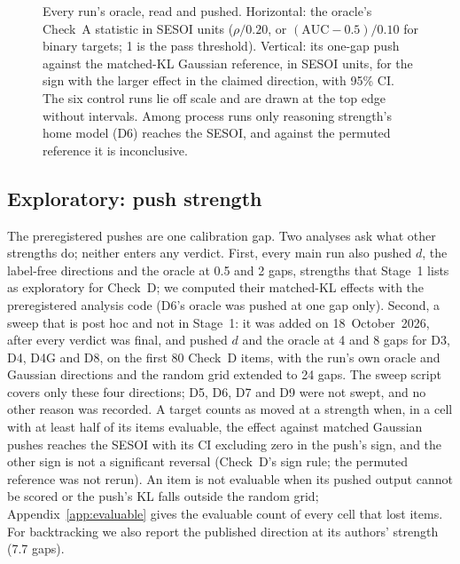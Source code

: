 \documentclass[11pt]{article}
\begin{document}
\begin{figure}[t]
\caption{Every run's oracle, read and pushed. Horizontal: the oracle's Check~A statistic in SESOI units ($\rho/0.20$, or $(\text{AUC}-0.5)/0.10$ for binary targets; 1 is the pass threshold). Vertical: its one-gap push against the matched-KL Gaussian reference, in SESOI units, for the sign with the larger effect in the claimed direction, with 95\% CI. The six control runs lie off scale and are drawn at the top edge without intervals. Among process runs only reasoning strength's home model (D6) reaches the SESOI, and against the permuted reference it is inconclusive.}
\label{fig:oracle}
\end{figure}

\subsection{Exploratory: push strength}\label{sec:strength}
The preregistered pushes are one calibration gap. Two analyses ask what other strengths do; neither enters any verdict. First, every main run also pushed $d$, the label-free directions and the oracle at 0.5 and 2 gaps, strengths that Stage~1 lists as exploratory for Check~D; we computed their matched-KL effects with the preregistered analysis code (D6's oracle was pushed at one gap only). Second, a sweep that is post hoc and not in Stage~1: it was added on 18~October~2026, after every verdict was final, and pushed $d$ and the oracle at 4 and 8 gaps for D3, D4, D4G and D8, on the first 80 Check~D items, with the run's own oracle and Gaussian directions and the random grid extended to 24 gaps. The sweep script covers only these four directions; D5, D6, D7 and D9 were not swept, and no other reason was recorded. A target counts as moved at a strength when, in a cell with at least half of its items evaluable, the effect against matched Gaussian pushes reaches the SESOI with its CI excluding zero in the push's sign, and the other sign is not a significant reversal (Check~D's sign rule; the permuted reference was not rerun). An item is not evaluable when its pushed output cannot be scored or the push's KL falls outside the random grid; Appendix~\ref{app:evaluable} gives the evaluable count of every cell that lost items. For backtracking we also report the published direction at its authors' strength (7.7 gaps).
\end{document}

